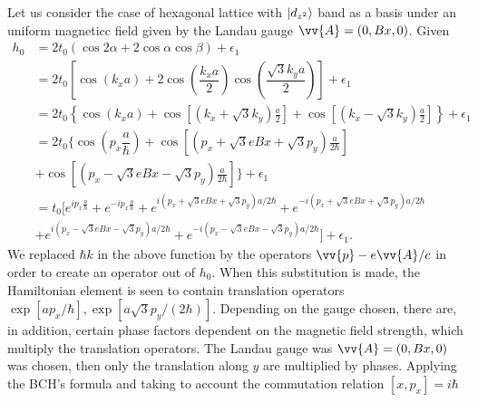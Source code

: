 \documentclass{report}
\newcommand{\f}[2]{\dfrac{#1}{#2}}
\begin{document}
Let us consider the case of hexagonal lattice with $\ket{d_{z^{2}}}$ band as a basis under an uniform magneticc field given by the Landau gauge $\vv{A} = (0, Bx,0)$. Given
\begin{equation}
	\begin{aligned}
		h_0
		 & = 2 t_0 \left(\cos2\alpha + 2\cos\alpha \cos\beta\right) + \epsilon_1                                                                                                                         \\
		 & = 2t_{0} \left[ \cos(k_x a) + 2 \cos \left(\f{k_x a}{2}\right) \cos \left(\f{\sqrt{3}k_y a}{2}\right) \right] + \epsilon_1                                                                    \\
		 & = 2t_{0} \left\{ \cos(k_x a) + \cos\left[\left( k_{x} + \sqrt{3} k_{y} \right)\frac{a}{2}\right] + \cos\left[\left( k_{x} - \sqrt{3} k_{y} \right)\frac{a}{2}\right]\right\} + \epsilon_1     \\
		 & = 2t_{0} \Biggl\{ \cos(p_{x}\f{a}{\hbar}) + \cos \left[\left(p_{x} + \sqrt{3} e B x + \sqrt{3} p_{y}\right)\frac{a}{2\hbar}\right]                                                            \\
		 & + \cos \left[\left(p_{x} - \sqrt{3} e B x - \sqrt{3} p_{y}\right)\frac{a}{2\hbar}\right] \Biggr\} + \epsilon_1                                                                                \\
		 & = t_{0} \biggl[e^{i p_{x}\frac{a}{\hbar}} + e^{-ip_{x}\frac{a}{\hbar}} + e^{i(p_{x} + \sqrt{3} eBx + \sqrt{3} p_{y} ) a / 2\hbar} + e^{-i(p_{x} + \sqrt{3} eBx + \sqrt{3} p_{y} ) a / 2\hbar} \\
		 & + e^{i(p_{x} - \sqrt{3} eBx - \sqrt{3} p_{y} ) a / 2\hbar} + e^{-i(p_{x} - \sqrt{3} eBx - \sqrt{3} p_{y} ) a / 2\hbar} \biggr] + \epsilon_1.
	\end{aligned}
\end{equation}
We replaced $\hbar k$ in the above function by the operators $\vv{p} - e \vv{A} / c$ in order to create an operator out of $h_{0}$. When this substitution is made, the Hamiltonian element is seen to contain translation operators $\exp[a p_{x} / \hbar],\exp[a \sqrt{3} p_{y} / (2\hbar)]$. Depending on the gauge chosen, there are, in addition, certain phase factors dependent on the magnetic field strength, which multiply the translation operators. The Landau gauge was $\vv{A} = (0,Bx,0)$ was chosen, then only the translation along $y$ are multiplied by phases. \cite{PhysRevB.14.2239}
Applying the BCH's formula and taking to account the commutation relation $\left[x,p_{x}\right] = i \hbar$
\end{document}
